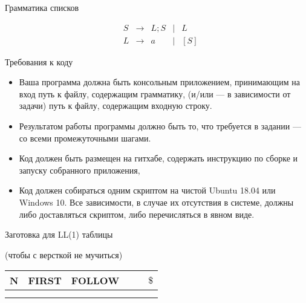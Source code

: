 \documentclass[12pt]{article}
\begin{document}
\bigskip

\begin{center} Грамматика списков \end{center}

    $$
    \begin{array}{cccccccccc}
       &S & \rightarrow & L ; S & \mid & L \\
       &L & \rightarrow & a & \mid & [S] 
    \end{array}
    $$

\newpage

\begin{center} Требования к коду \end{center}
\begin{itemize}
\item Ваша программа должна быть консольным приложением, принимающим на вход путь к файлу, содержащим грамматику, (и/или --- в зависимости от задачи) путь к файлу, содержащим входную строку. 
\item Результатом работы программы должно быть то, что требуется в задании --- со всеми промежуточными шагами. 
\item Код должен быть размещен на гитхабе, содержать инструкцию по сборке и запуску собранного приложения, 
\item Код должен собираться одним скриптом на чистой Ubuntu 18.04 или Windows 10. Все зависимости, в случае их отсутствия в системе, должны либо доставляться скриптом, либо перечисляться в явном виде.
\end{itemize}

\bigskip

\begin{center} Заготовка для LL(1) таблицы

(чтобы с версткой не мучиться)
\end{center}
\begin{center}
\begin{tabular}{ l || c | c || c | c | c }
  N & FIRST & FOLLOW &  &  & $ \$ $ \\ \hline  
    &       &        &  &  & \\ 
    &       &        &  &  & 

\end{tabular}  
\end{center}


\end{document}
